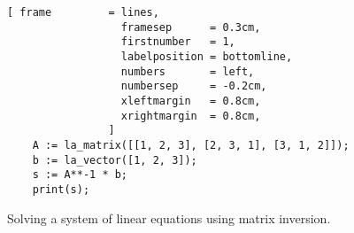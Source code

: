 \begin{figure}[!ht]
\centering
\begin{Verbatim}[ frame         = lines, 
                  framesep      = 0.3cm, 
                  firstnumber   = 1,
                  labelposition = bottomline,
                  numbers       = left,
                  numbersep     = -0.2cm,
                  xleftmargin   = 0.8cm,
                  xrightmargin  = 0.8cm,
                ]
    A := la_matrix([[1, 2, 3], [2, 3, 1], [3, 1, 2]]);
    b := la_vector([1, 2, 3]);
    s := A**-1 * b;
    print(s);
\end{Verbatim}
\vspace*{-0.3cm}
\caption{Solving a system of linear equations using matrix inversion.}
\label{fig:solve-linear.stlx}
\end{figure}


